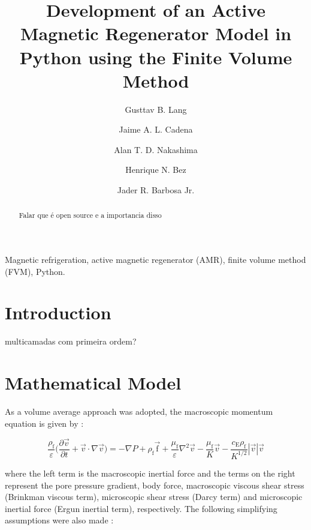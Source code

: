 \documentclass[review,preprint,12pt]{elsarticle}
\begin{document}
\begin{frontmatter}

\title{Development of an Active Magnetic Regenerator Model in Python using the Finite Volume Method}
\author{Gusttav B. Lang}
\author{Jaime A. L. Cadena}
\author{Alan T. D. Nakashima}
\author{Henrique N. Bez}
\author{Jader R. Barbosa Jr.}
\address{POLO Research Laboratories for Emerging Technologies in Cooling and Thermophysics, Department of Mechanical Engineering, Federal University of Santa Catarina (UFSC), Florian\'{o}polis, SC, 88040900, Brazil, Phone/Fax: (+ 55) 48 3721-7900}

\begin{abstract}

Falar que é open source e a importancia disso

\end{abstract}

\end{frontmatter}

\vspace{0.5cm}

 Magnetic refrigeration, active magnetic regenerator (AMR), finite volume method (FVM), Python.

\printnomenclature[1.4cm]

\pagebreak

\section{Introduction}

multicamadas com primeira ordem?


\section{Mathematical Model}


As a volume average approach was adopted, the macroscopic momentum equation is given by \cite{Kaviany1995,Nield2006}:

\begin{equation}
\frac{\rho_\textrm{f}}{\varepsilon}\Biggl(\frac{\partial\vec{v}}{\partial t} + \vec{v}\cdot\nabla\vec{v}\Biggr) = -\nabla P + \rho_\textrm{f}\vec{\textrm{f}} + \frac{\mu_\textrm{f}}{\varepsilon}\nabla^2\vec{v} - \frac{\mu_\textrm{f}}{K}\vec{v} -
\frac{c_\textrm{E}\rho_\textrm{f}}{K^{1/2}}|\vec{v}|\vec{v}
\label{BrinkFroch}
\end{equation}

\noindent where the left term is the macroscopic inertial force and the terms on the right represent the pore pressure gradient, body force, macroscopic viscous shear stress (Brinkman viscous term), microscopic shear stress (Darcy term) and microscopic inertial force (Ergun inertial term), respectively. The following simplifying assumptions were also made \cite{Trevizoli2015}:
\end{document}
